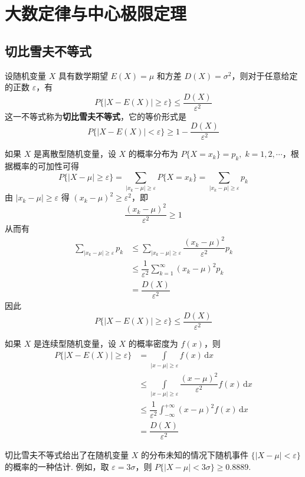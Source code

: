 \chapter{大数定律与中心极限定理}

\section{切比雪夫不等式}

\begin{theorem}
    设随机变量 $X$ 具有数学期望 $E(X)=\mu$ 和方差 $D(X) = \sigma^2$，则对于任意给定的正数 $\varepsilon$，有
    $$
    P\{ |X-E(X)| \geqslant \varepsilon \} \leqslant \dfrac{D(X)}{\varepsilon^2}
    $$
    这一不等式称为\textbf{切比雪夫不等式}，它的等价形式是
    $$
    P\{ |X-E(X)| < \varepsilon \} \geqslant 1 - \dfrac{D(X)}{\varepsilon^2}
    $$
\end{theorem}

\begin{myproof}
    如果 $X$ 是离散型随机变量，设 $X$ 的概率分布为 $P\{X = x_k\} = p_k, \; k=1,2,\cdots$，根据概率的可加性可得
    $$
    P\{ |X-\mu| \geqslant \varepsilon \} = \sum_{|x_k-\mu| \geqslant \varepsilon} P\{ X=x_k \} = \sum_{|x_k-\mu| \geqslant \varepsilon} p_k
    $$
    由 $|x_k-\mu| \geqslant \varepsilon$ 得 $(x_k-\mu)^2 \geqslant \varepsilon^2$，即
    $$
    \dfrac{(x_k-\mu)^2}{\varepsilon^2} \geqslant 1
    $$
    从而有
    $$
    \begin{aligned}
        \sum_{|x_k-\mu| \geqslant \varepsilon} p_k & \leqslant \sum_{|x_k-\mu| \geqslant \varepsilon} \dfrac{(x_k-\mu)^2}{\varepsilon^2} p_k \\
        & \leqslant \dfrac{1}{\varepsilon^2} \sum_{k=1}^{\infty} (x_k-\mu)^2 p_k \\
        &= \dfrac{D(X)}{\varepsilon^2}
    \end{aligned}
    $$
    因此
    $$
    P\{ |X-E(X)| \geqslant \varepsilon \} \leqslant \dfrac{D(X)}{\varepsilon^2}
    $$

    如果 $X$ 是连续型随机变量，设 $X$ 的概率密度为 $f(x)$，则
    $$
    \begin{aligned}
        P\{ |X-E(X)| \geqslant \varepsilon \} &= \underset{|x-\mu| \geqslant \varepsilon}{\int} f(x) \, \text{d}x \\
         & \leqslant \underset{|x-\mu| \geqslant \varepsilon}{\int} \dfrac{(x-\mu)^2}{\varepsilon^2} f(x) \, \text{d}x \\
         & \leqslant \dfrac{1}{\varepsilon^2} \int_{-\infty}^{+\infty} (x-\mu)^2 f(x) \, \text{d}x \\
         &= \dfrac{D(X)}{\varepsilon^2}
    \end{aligned}
    $$
\end{myproof}

切比雪夫不等式给出了在随机变量 $X$ 的分布未知的情况下随机事件 $\{ |X-\mu| < \varepsilon \}$ 的概率的一种估计. 例如，取 $\varepsilon = 3\sigma$，则 $P\{ |X-\mu| < 3\sigma \} \geqslant 0.8889$.